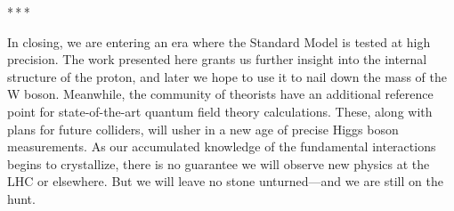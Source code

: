 \bigskip\par\centerline{*\,*\,*}\medskip\par

In closing, we are entering an era where the Standard Model is tested at high precision.
The work presented here grants us further insight into the internal structure of the proton, and later we hope to use it to nail down the mass of the W boson.
Meanwhile, the community of theorists have an additional reference point for state-of-the-art quantum field theory calculations.
These, along with plans for future colliders, will usher in a new age of precise Higgs boson measurements.
As our accumulated knowledge of the fundamental interactions begins to crystallize, there is no guarantee we will observe new physics at the LHC or elsewhere.
But we will leave no stone unturned---and we are still on the hunt.
